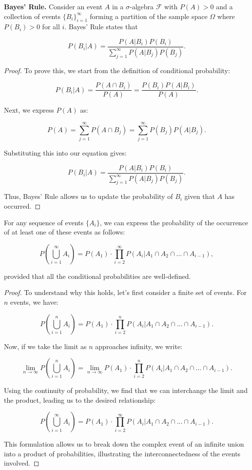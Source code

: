 \begin{theorem}
    \textbf{Bayes' Rule.} Consider an event \( A \) in a \(\sigma\)-algebra \( \mathcal{F} \) with \( P(A) > 0 \) and a collection of events \( \{B_i\}_{i=1}^{\infty} \) forming a partition of the sample space \( \Omega \) where \( P(B_i) > 0 \) for all \( i \). Bayes' Rule states that 

\[
P(B_i | A) = \frac{P(A | B_i) P(B_i)}{\sum_{j=1}^{\infty} P(A | B_j) P(B_j)}.
\]
\end{theorem}

\begin{proof}
To prove this, we start from the definition of conditional probability:

\[
P(B_i | A) = \frac{P(A \cap B_i)}{P(A)} = \frac{P(B_i) P(A | B_i)}{P(A)}.
\]

Next, we express \( P(A) \) as:

\[
P(A) = \sum_{j=1}^{\infty} P(A \cap B_j) = \sum_{j=1}^{\infty} P(B_j) P(A | B_j).
\]

Substituting this into our equation gives:

\[
P(B_i | A) = \frac{P(A | B_i) P(B_i)}{\sum_{j=1}^{\infty} P(A | B_j) P(B_j)}.
\]

Thus, Bayes' Rule allows us to update the probability of \( B_i \) given that \( A \) has occurred.
\end{proof}

\begin{theorem}
    For any sequence of events \(\{A_i\}\), we can express the probability of the occurrence of at least one of these events as follows:

\[
P\left(\bigcup_{i=1}^{\infty} A_i\right) = P(A_1) \cdot \prod_{i=2}^{\infty} P(A_i | A_1 \cap A_2 \cap \ldots \cap A_{i-1}),
\]

provided that all the conditional probabilities are well-defined.
\end{theorem}

\begin{proof}
    To understand why this holds, let’s first consider a finite set of events. For \(n\) events, we have:

\[
P\left(\bigcup_{i=1}^{n} A_i\right) = P(A_1) \cdot \prod_{i=2}^{n} P(A_i | A_1 \cap A_2 \cap \ldots \cap A_{i-1}).
\]

Now, if we take the limit as \(n\) approaches infinity, we write:

\[
\lim_{n \to \infty} P\left(\bigcup_{i=1}^{n} A_i\right) = \lim_{n \to \infty} P(A_1) \cdot \prod_{i=2}^{n} P(A_i | A_1 \cap A_2 \cap \ldots \cap A_{i-1}).
\]

Using the continuity of probability, we find that we can interchange the limit and the product, leading us to the desired relationship:

\[
P\left(\bigcup_{i=1}^{\infty} A_i\right) = P(A_1) \cdot \prod_{i=2}^{\infty} P(A_i | A_1 \cap A_2 \cap \ldots \cap A_{i-1}).
\]

This formulation allows us to break down the complex event of an infinite union into a product of probabilities, illustrating the interconnectedness of the events involved.
\end{proof}